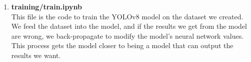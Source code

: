 \begin{enumerate}
\begin{enumerate}
      \item \textbf{training/train.ipynb}\\
            This file is the code to train the YOLOv8 model on the dataset we created.\\
            We feed the dataset into the model, and if the results we get from the model are wrong, we back-propagate to modify the model's neural network values. This process gets the model closer to being a model that can output the results we want.\\
    \end{enumerate}
\end{enumerate}